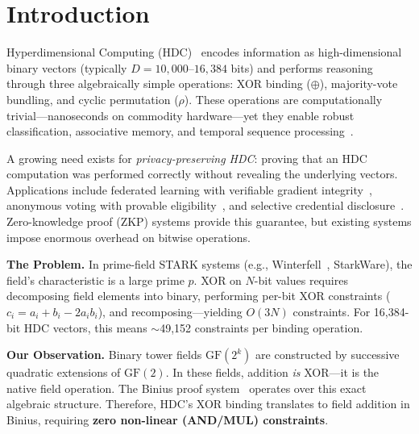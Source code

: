 \documentclass[11pt,twocolumn]{article}
\begin{document}
\section{Introduction}

Hyperdimensional Computing (HDC)~\cite{kanerva2009hyperdimensional} encodes information as high-dimensional binary vectors (typically $D = 10{,}000$--$16{,}384$ bits) and performs reasoning through three algebraically simple operations: XOR binding ($\oplus$), majority-vote bundling, and cyclic permutation ($\rho$). These operations are computationally trivial---nanoseconds on commodity hardware---yet they enable robust classification, associative memory, and temporal sequence processing~\cite{rahimi2016robust}.

A growing need exists for \emph{privacy-preserving HDC}: proving that an HDC computation was performed correctly without revealing the underlying vectors. Applications include federated learning with verifiable gradient integrity~\cite{bonawitz2017practical}, anonymous voting with provable eligibility~\cite{groth2016size}, and selective credential disclosure~\cite{camenisch2001efficient}. Zero-knowledge proof (ZKP) systems provide this guarantee, but existing systems impose enormous overhead on bitwise operations.

\textbf{The Problem.} In prime-field STARK systems (e.g., Winterfell~\cite{winterfell}, StarkWare), the field's characteristic is a large prime $p$. XOR on $N$-bit values requires decomposing field elements into binary, performing per-bit XOR constraints ($c_i = a_i + b_i - 2a_ib_i$), and recomposing---yielding $O(3N)$ constraints. For 16,384-bit HDC vectors, this means $\sim$49,152 constraints per binding operation.

\textbf{Our Observation.} Binary tower fields $\mathrm{GF}(2^k)$ are constructed by successive quadratic extensions of $\mathrm{GF}(2)$. In these fields, addition \emph{is} XOR---it is the native field operation. The Binius proof system~\cite{diamond2023binius} operates over this exact algebraic structure. Therefore, HDC's XOR binding translates to field addition in Binius, requiring \textbf{zero non-linear (AND/MUL) constraints}.
\end{document}
